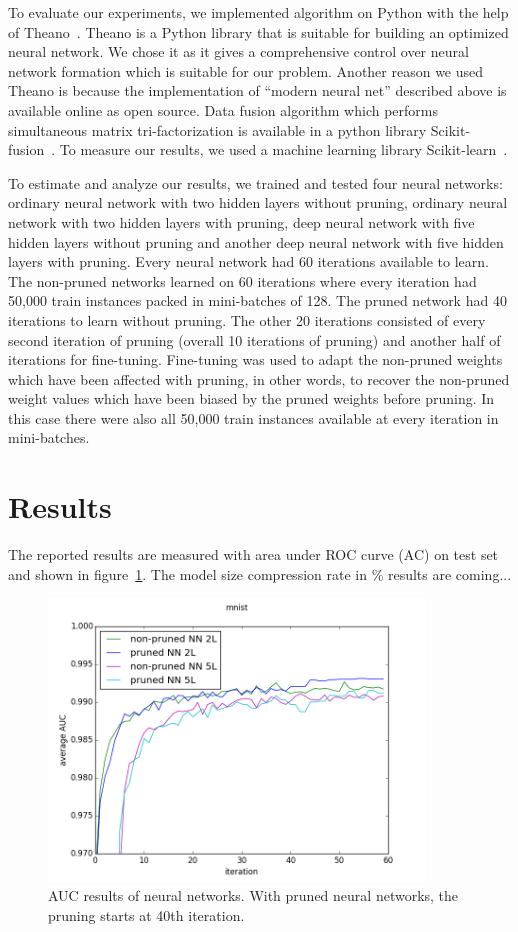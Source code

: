 \documentclass{article} %
\begin{document}
To evaluate our experiments, we implemented algorithm on Python with the help
of Theano~\cite{Bastien-Theano-2012, bergstra+al:2010-scipy}. Theano is a
Python library that is suitable for building an optimized neural network. We
chose it as it gives a comprehensive control over neural network formation
which is suitable for our problem. Another reason we used Theano is because the
implementation of “modern neural net” described above is available online as
open source. Data fusion algorithm which performs simultaneous matrix
tri-factorization is available in a python library
Scikit-fusion~\cite{zitnik2015data}. To measure our results, we used a machine
learning library Scikit-learn~\cite{scikit-learn}.

To estimate and analyze our results, we trained and tested four neural
networks: ordinary neural network with two hidden layers without pruning,
ordinary neural network with two hidden layers with pruning, deep neural
network with five hidden layers without pruning and another deep neural network
with five hidden layers with pruning. Every neural network had 60 iterations
available to learn. The non-pruned networks learned on 60 iterations where
every iteration had 50,000 train instances packed in mini-batches of 128. The
pruned network had 40 iterations to learn without pruning. The other 20
iterations consisted of every second iteration of pruning (overall 10
iterations of pruning) and another half of iterations for fine-tuning.
Fine-tuning was used to adapt the non-pruned weights which have been affected
with pruning, in other words, to recover the non-pruned weight values which
have been biased by the pruned weights before pruning. In this case there were
also all 50,000 train instances available at every iteration in mini-batches.

\section{Results}
The reported results are measured with area under ROC curve (AC) on test set 
and shown in figure~\ref{f:results}. The model size compression rate in \% 
results are coming...
\begin{figure}[!ht]
\centering
\includegraphics[width=10cm]{mnist2.png}
\caption{AUC results of neural networks. With pruned neural networks, the 
pruning starts at 40th iteration.}
\label{f:results}
\end{figure}
\end{document}
